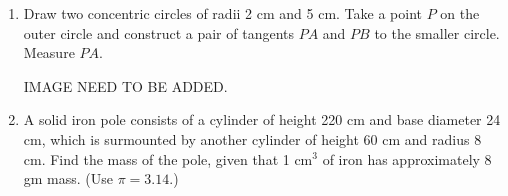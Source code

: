 \begin{enumerate}[label=\thesubsection.\arabic*, ref=\thesubsection.\theenumi]
	The geometric scaling corresponds to an isotropic dilation operator $\mathbf{H}_s = s\mathbf{I}_2$ with scale factor $s = \frac{2}{3}$:
	\begin{align*}
		\mathbf{H}_{2/3} = \begin{bmatrix} \frac{2}{3} & 0 \\ 0 & \frac{2}{3} \end{bmatrix}
	\end{align*}
	
	Transforming the vertex coordinates:
	\begin{align*}
		\mathbf{v}_{C'} &= \mathbf{H}_{2/3}\mathbf{v}_C = \begin{bmatrix} \frac{2}{3} & 0 \\ 0 & \frac{2}{3} \end{bmatrix} \begin{bmatrix} 5 \\ 0 \end{bmatrix} = \begin{bmatrix} \frac{10}{3} \\ 0 \end{bmatrix} \\
		\mathbf{v}_{A'} &= \mathbf{H}_{2/3}\mathbf{v}_A = \begin{bmatrix} \frac{2}{3} & 0 \\ 0 & \frac{2}{3} \end{bmatrix} \begin{bmatrix} 2.5 \\ 2.5\sqrt{3} \end{bmatrix} = \begin{bmatrix} \frac{5}{3} \\ \frac{5\sqrt{3}}{3} \end{bmatrix}
	\end{align*}
	
	The side length of the scaled simplex is:
	\begin{align*}
		\|\mathbf{v}_{C'} - \mathbf{v}_B\|_2 = \frac{10}{3}\text{ cm} \approx 3.33\text{ cm}
	\end{align*}

	\item Draw two concentric circles of radii 2 cm and 5 cm. Take a
	point $P$ on the outer circle and construct a pair of tangents
	$PA$ and $PB$ to the smaller circle. Measure $PA$.
	
	
	IMAGE NEED TO BE ADDED.
	
	
	\item A solid iron pole consists of a cylinder of height
	220 cm and base diameter 24 cm, which is surmounted by
	another cylinder of height 60 cm and radius 8 cm. Find the
	mass of the pole, given that 1 cm$^3$ of iron has approximately
	8 gm mass. (Use $\pi=3.14$.)
	

\end{enumerate}
